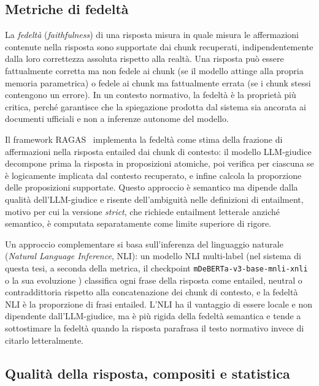 \subsection{Metriche di fedeltà}
\label{subsec:metr-faithfulness}

La \emph{fedeltà} (\emph{faithfulness}) di una risposta misura in quale misura
le affermazioni contenute nella risposta sono supportate dai chunk recuperati,
indipendentemente dalla loro correttezza assoluta rispetto alla realtà. Una
risposta può essere fattualmente corretta ma non fedele ai chunk (se il
modello attinge alla propria memoria parametrica) o fedele ai chunk ma
fattualmente errata (se i chunk stessi contengono un errore). In un contesto
normativo, la fedeltà è la proprietà più critica, perché garantisce che la
spiegazione prodotta dal sistema sia ancorata ai documenti ufficiali e non
a inferenze autonome del modello.

Il framework RAGAS~\cite{ragas2024} implementa la fedeltà come stima della
frazione di affermazioni nella risposta entailed dai chunk di contesto: il
modello LLM-giudice decompone prima la risposta in proposizioni atomiche,
poi verifica per ciascuna se è logicamente implicata dal contesto recuperato,
e infine calcola la proporzione delle proposizioni supportate. Questo approccio
è semantico ma dipende dalla qualità dell'LLM-giudice e risente dell'ambiguità
nelle definizioni di entailment, motivo per cui la versione \emph{strict},
che richiede entailment letterale anziché semantico, è computata
separatamente come limite superiore di rigore.

Un approccio complementare si basa sull'inferenza del linguaggio naturale
(\emph{Natural Language Inference}, NLI): un modello NLI multi-label (nel sistema di questa tesi, a seconda
della metrica, il checkpoint \texttt{mDeBERTa-v3-base-mnli-xnli} o la sua
evoluzione \nlimodel{}) classifica ogni frase della risposta come entailed, neutral
o contraddittoria rispetto alla concatenazione dei chunk di contesto, e la
fedeltà NLI è la proporzione di frasi entailed. L'NLI ha il vantaggio di
essere locale e non dipendente dall'LLM-giudice, ma è più rigida della
fedeltà semantica e tende a sottostimare la fedeltà quando la risposta
parafrasa il testo normativo invece di citarlo letteralmente.

\subsection{Qualità della risposta, compositi e statistica}
\label{subsec:metr-quality}

